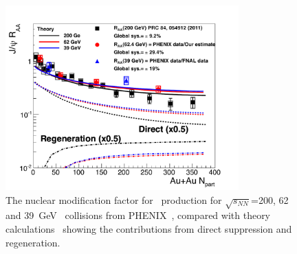 \begin{figure}[!htb]
\centerline{
\includegraphics[width=0.8\textwidth]{fig/PHENIX_AuAu_excitation_function}
}
\caption[PHENIX data for \Jpsi\ production compared to theory calculations]{The nuclear modification factor for \Jpsi\ production for $\sqrt{s_{NN}}$=200, 62 and 39~GeV \AuAu\ collisions from
PHENIX~\cite{Adare:2012wf}, compared with theory calculations~\cite{Zhao:2010nk} showing the contributions from direct
suppression and regeneration.
}
\label{fig:PHENIX_excitation_function}
\end{figure}

